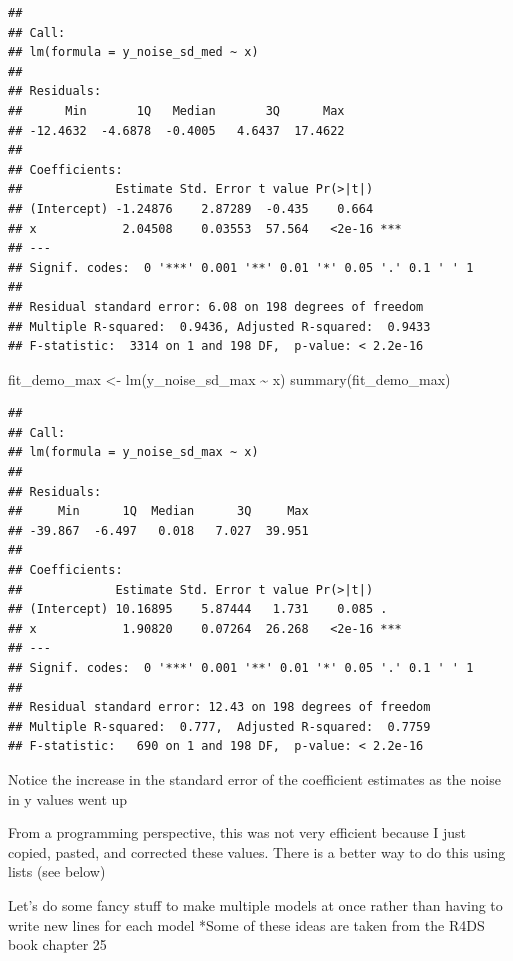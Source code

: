 \documentclass[
]{book}
\newenvironment{Shaded}{\begin{snugshade}}{\end{snugshade}}
\newcommand{\FunctionTok}[1]{\textcolor[rgb]{0.00,0.00,0.00}{#1}}
\newcommand{\NormalTok}[1]{#1}
\newcommand{\OtherTok}[1]{\textcolor[rgb]{0.56,0.35,0.01}{#1}}
\newcommand{\SpecialCharTok}[1]{\textcolor[rgb]{0.00,0.00,0.00}{#1}}
\begin{document}
\begin{verbatim}
## 
## Call:
## lm(formula = y_noise_sd_med ~ x)
## 
## Residuals:
##      Min       1Q   Median       3Q      Max 
## -12.4632  -4.6878  -0.4005   4.6437  17.4622 
## 
## Coefficients:
##             Estimate Std. Error t value Pr(>|t|)    
## (Intercept) -1.24876    2.87289  -0.435    0.664    
## x            2.04508    0.03553  57.564   <2e-16 ***
## ---
## Signif. codes:  0 '***' 0.001 '**' 0.01 '*' 0.05 '.' 0.1 ' ' 1
## 
## Residual standard error: 6.08 on 198 degrees of freedom
## Multiple R-squared:  0.9436, Adjusted R-squared:  0.9433 
## F-statistic:  3314 on 1 and 198 DF,  p-value: < 2.2e-16
\end{verbatim}

\begin{Shaded}
\begin{Highlighting}[]
\NormalTok{fit\_demo\_max }\OtherTok{\textless{}{-}} \FunctionTok{lm}\NormalTok{(y\_noise\_sd\_max }\SpecialCharTok{\textasciitilde{}}\NormalTok{ x)}
\FunctionTok{summary}\NormalTok{(fit\_demo\_max)}
\end{Highlighting}
\end{Shaded}

\begin{verbatim}
## 
## Call:
## lm(formula = y_noise_sd_max ~ x)
## 
## Residuals:
##     Min      1Q  Median      3Q     Max 
## -39.867  -6.497   0.018   7.027  39.951 
## 
## Coefficients:
##             Estimate Std. Error t value Pr(>|t|)    
## (Intercept) 10.16895    5.87444   1.731    0.085 .  
## x            1.90820    0.07264  26.268   <2e-16 ***
## ---
## Signif. codes:  0 '***' 0.001 '**' 0.01 '*' 0.05 '.' 0.1 ' ' 1
## 
## Residual standard error: 12.43 on 198 degrees of freedom
## Multiple R-squared:  0.777,  Adjusted R-squared:  0.7759 
## F-statistic:   690 on 1 and 198 DF,  p-value: < 2.2e-16
\end{verbatim}

Notice the increase in the standard error of the coefficient estimates as the noise in y values went up

From a programming perspective, this was not very efficient because I just copied, pasted, and corrected these values.
There is a better way to do this using lists (see below)

Let's do some fancy stuff to make multiple models at once rather than having to write new lines for each model
*Some of these ideas are taken from the R4DS book chapter 25
\end{document}
